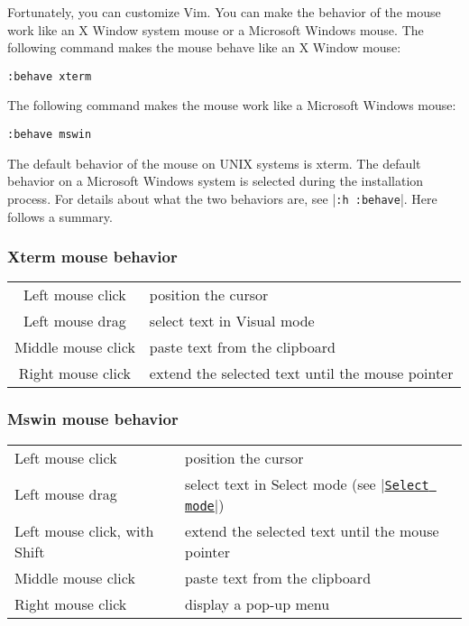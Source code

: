 Fortunately, you can customize Vim.
You can make the behavior of the mouse work like an X Window system mouse or a Microsoft Windows mouse.
The following command makes the mouse behave like an X Window mouse:

 \begin{Verbatim}[samepage=true]
 :behave xterm
 \end{Verbatim}

The following command makes the mouse work like a Microsoft Windows mouse:

 \begin{Verbatim}[samepage=true]
 :behave mswin
 \end{Verbatim}

The default behavior of the mouse on UNIX systems is xterm.
The default behavior on a Microsoft Windows system is selected during the installation process.
For details about what the two behaviors are, see |\texttt{:h :behave}|.
Here follows a summary.
\subsubsection{Xterm mouse behavior}

\begin{center}\begin{longtable}{c l}
				Left mouse click & position the cursor \\
				Left mouse drag & select text in Visual mode \\
				Middle mouse click & paste text from the clipboard \\
				Right mouse click & extend the selected text until the mouse pointer \\
\end{longtable}\end{center}

\subsubsection{Mswin mouse behavior}

\begin{center}\begin{longtable}{l l}
				Left mouse click & position the cursor \\
				Left mouse drag & select text in Select mode (see |\hyperref[Select mode]{\texttt{Select mode}}|) \\
				Left mouse click, with Shift & extend the selected text until the mouse pointer \\
				Middle mouse click & paste text from the clipboard \\
				Right mouse click & display a pop-up menu \\
\end{longtable}\end{center}

